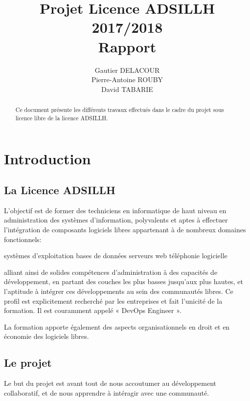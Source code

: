 \documentclass[12pt]{report}
\title{Projet Licence ADSILLH 2017/2018\\Rapport}
\author{Gautier DELACOUR\\Pierre-Antoine ROUBY\\David TABARIE} %
\begin{document}
\maketitle

\begin{abstract}
Ce document présente les différents travaux effectués dans le cadre du projet sous licence libre de la licence ADSILLH.

\end{abstract}

\tableofcontents

\chapter{Introduction}

\section{La Licence ADSILLH}
L'objectif est de former des techniciens en informatique de haut
niveau en administration des systèmes d'information, polyvalents et
aptes à effectuer l'intégration de composants logiciels libres
appartenant à de nombreux domaines fonctionnels:

systèmes d'exploitation
bases de données
serveurs web
téléphonie logicielle

alliant ainsi de solides compétences d'administration à des capacités
de développement, en partant des couches les plus basses jusqu'aux
plus hautes, et l'aptitude à intégrer ces développements au sein des
communautés libres. Ce profil est explicitement recherché par les
entreprises et fait l'unicité de la formation. Il est couramment
appelé « DevOps Engineer ».

La formation apporte également des aspects organisationnels en droit
et en économie des logiciels libres.

\section{Le projet}
Le but du projet est avant tout de nous accoutumer au développement
collaboratif, et de nous apprendre à intéragir avec une communauté.
\end{document}

